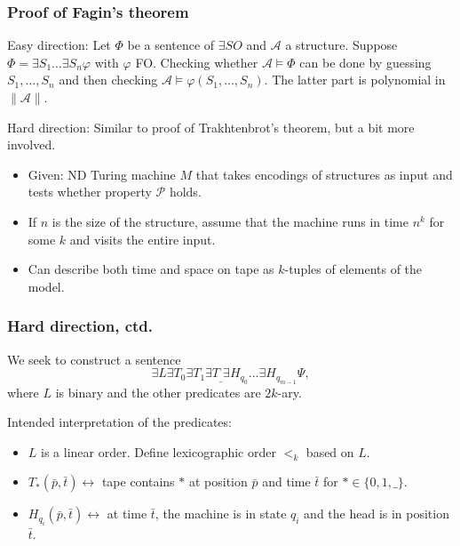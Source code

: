 \documentclass{beamer}
\newcommand{\A}{\mathcal{A}}
\renewcommand{\P}{\mathcal{P}}
\begin{document}
\begin{frame}
 \frametitle{Proof of Fagin's theorem}
 Easy direction: Let $Φ$ be a sentence of $\exists SO$ and $\A$ a structure. Suppose $Φ = \exists S_1 … \exists S_n φ$ with $φ$ FO. Checking whether $\A \vDash Φ$ can be done by guessing $S_1,…,S_n$ and then checking $\A \vDash φ(S_1,…,S_n)$. The latter part is polynomial in $\|\A\|$.
 
 \medskip
 
 Hard direction: Similar to proof of Trakhtenbrot's theorem, but a bit more involved.
 \begin{itemize}
 	\item Given: ND Turing machine $M$ that takes encodings of structures as input and tests whether property $\P$ holds.
 	\item If $n$ is the size of the structure, assume that the machine runs in time $n^k$ for some $k$ and visits the entire input.
 	\item Can describe both time and space on tape as $k$-tuples of elements of the model.
 \end{itemize}
\end{frame}

\begin{frame}
	\frametitle{Hard direction, ctd.}
	We seek to construct a sentence
	\begin{equation*}
	∃L ∃T_0 ∃T_1 ∃T_{\_} ∃H_{q_0} … ∃H_{q_{m-1}} Ψ,
	\end{equation*}
	where $L$ is binary and the other predicates are $2k$-ary.
	
	Intended interpretation of the predicates:
	\begin{itemize}
	\item $L$ is a linear order. Define lexicographic order $<_k$ based on $L$.
	\item $T_{*}(\bar{p}, \bar{t}) \leftrightarrow$ tape contains $*$ at position $\bar{p}$ and time $\bar{t}$ for $* ∈ \{0, 1, \_\}$.
	\item $H_{q_i}(\bar{p},\bar{t}) \leftrightarrow$ at time $\bar{t}$, the machine is in state $q_{i}$ and the head is in position $\bar{t}$.
	\end{itemize}
\end{frame}
\end{document}
